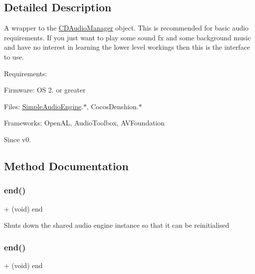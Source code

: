 \subsection{Detailed Description}
A wrapper to the \hyperlink{interfaceCDAudioManager}{C\+D\+Audio\+Manager} object. This is recommended for basic audio requirements. If you just want to play some sound fx and some background music and have no interest in learning the lower level workings then this is the interface to use.

Requirements\+:
\begin{DoxyItemize}
\item Firmware\+: OS 2. or greater
\item Files\+: \hyperlink{interfaceSimpleAudioEngine}{Simple\+Audio\+Engine}.$\ast$, Cocos\+Denshion.$\ast$
\item Frameworks\+: Open\+AL, Audio\+Toolbox, A\+V\+Foundation \begin{DoxySince}{Since}
v0. 
\end{DoxySince}

\end{DoxyItemize}

\subsection{Method Documentation}
\mbox{\label{interfaceSimpleAudioEngine_a2750af49fe41ee3fcf3d544f05ef3c73}} 
\subsubsection{\texorpdfstring{end()}{end()}\hspace{0.1cm}{\footnotesize\ttfamily [1/4]}}
{\footnotesize\ttfamily + (void) end \begin{DoxyParamCaption}{ }\end{DoxyParamCaption}}

Shuts down the shared audio engine instance so that it can be reinitialised \mbox{\label{interfaceSimpleAudioEngine_a2750af49fe41ee3fcf3d544f05ef3c73}} 
\subsubsection{\texorpdfstring{end()}{end()}\hspace{0.1cm}{\footnotesize\ttfamily [2/4]}}
{\footnotesize\ttfamily + (void) end \begin{DoxyParamCaption}{ }\end{DoxyParamCaption}}

